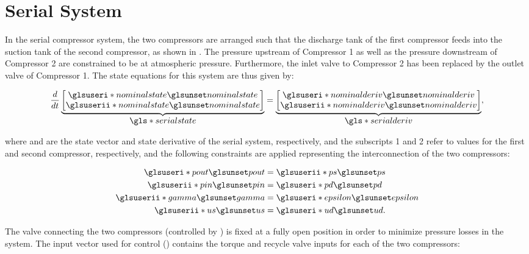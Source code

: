 \section{Serial System}
\label{sec:mod:serial}

In the serial compressor system, the two compressors are arranged such that the discharge tank of the first compressor feeds into the suction tank of the second compressor, as shown in .
The pressure upstream of Compressor 1 as well as the pressure downstream of Compressor 2 are constrained to be at atmospheric pressure.
Furthermore, the inlet valve to Compressor 2 has been replaced by the outlet valve of Compressor 1. The state equations for this system are thus given by:

\begin{equation}
  \dt{}
  \ubrace{\begin{bmatrix}
    \gi{nominalstate}\\
    \gii{nominalstate}\\
  \end{bmatrix}}{\g{serialstate}} =
  \ubrace{\begin{bmatrix}
    \gi{nominalderiv}\\
    \gii{nominalderiv}
  \end{bmatrix}}{\g{serialderiv}},
  \label{eq:mod:serial-state-eq}
\end{equation}

\noindent where  and  are the state vector and state derivative of the serial system, respectively, and the subscripts 1 and 2 refer to values for the first and second compressor, respectively, and the following constraints are applied representing the interconnection of the two compressors:

\begin{equation}
  \begin{split}
    \gi{pout} & = \gii{ps}\\
    \gii{pin} & = \gi{pd}\\
    \gii{gamma} & = \gi{epsilon}\\
    \gii{us} & = \gi{ud}.
  \end{split}
  \label{eq:mod:serial-constraints}
\end{equation}

The valve connecting the two compressors (controlled by ) is fixed at a fully open position in order to minimize pressure losses in the system.
The input vector used for control () contains the torque and recycle valve inputs for each of the two compressors:

